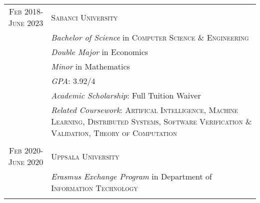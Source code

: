 \documentclass[a4paper,10pt]{article} %
\begin{document}
\begin{longtable}{r|p{11cm}}	


\textsc{Feb} 2018-\textsc{June} 2023& \textsc{Sabanci University}\\
& \small\emph{Bachelor of Science} in \textsc{Computer Science \& Engineering}\\%
& \small\emph{Double Major} in Economics\\
& \small\emph{Minor} in Mathematics\\
& \small\emph{GPA}: 3.92/4 \\
& \small\emph{Academic Scholarship}: Full Tuition Waiver\\
& \footnotesize{ \small\emph{Related Coursework}: \textsc{Artifical Intelligence}, \textsc{Machine Learning}, \textsc{Distributed Systems}, \textsc{Software Verification \& Validation}, \textsc{Theory of Computation}}\\
\multicolumn{2}{c}{} \\

\textsc{Feb} 2020-\textsc{June} 2020& \textsc{Uppsala University}\\
& \small\emph{Erasmus Exchange Program} in Department of \textsc{Information Technology}\\%
&\\

\end{longtable}

\end{document}
